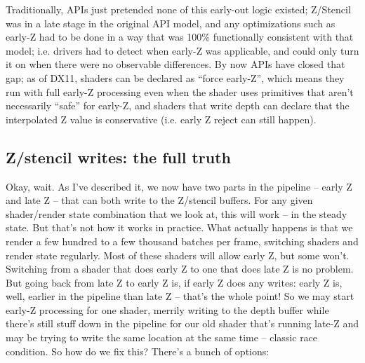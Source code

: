 \documentclass[12pt]{article}
\begin{document}
Traditionally, APIs just pretended none of this early-out logic existed; Z/Stencil was in a late stage in the original API model, and any optimizations such as early-Z had to be done in a way that was 100\% functionally consistent with that model; i.e. drivers had to detect when early-Z was applicable, and could only turn it on when there were no observable differences. By now APIs have closed that gap; as of DX11, shaders can be declared as “force early-Z”, which means they run with full early-Z processing even when the shader uses primitives that aren’t necessarily “safe” for early-Z, and shaders that write depth can declare that the interpolated Z value is conservative (i.e. early Z reject can still happen).

\subsection{Z/stencil writes: the full truth}
\label{sec:org614faf0}

Okay, wait. As I’ve described it, we now have two parts in the pipeline – early Z and late Z – that can both write to the Z/stencil buffers. For any given shader/render state combination that we look at, this will work – in the steady state. But that’s not how it works in practice. What actually happens is that we render a few hundred to a few thousand batches per frame, switching shaders and render state regularly. Most of these shaders will allow early Z, but some won’t. Switching from a shader that does early Z to one that does late Z is no problem. But going back from late Z to early Z is, if early Z does any writes: early Z is, well, earlier in the pipeline than late Z – that’s the whole point! So we may start early-Z processing for one shader, merrily writing to the depth buffer while there’s still stuff down in the pipeline for our old shader that’s running late-Z and may be trying to write the same location at the same time – classic race condition. So how do we fix this? There’s a bunch of options:
\end{document}
